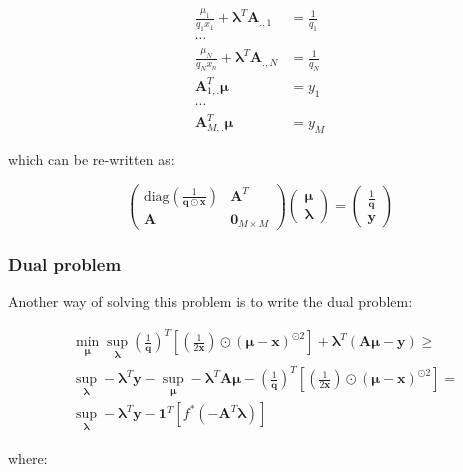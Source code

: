\documentclass{tex/note}
\begin{document}
\begin{align*}
\frac{\mu_1}{q_1 x_1} + \bm{\lambda}^T \bm{A}_{.,1} &= \frac{1}{q_1} \\
\cdots & \\
\frac{\mu_N}{q_N x_n} + \bm{\lambda}^T \bm{A}_{.,N} &= \frac{1}{q_N} \\
\bm{A}_{1,.}^T \bm{\mu} &= y_1 \\
\cdots & \\
\bm{A}_{M,.}^T \bm{\mu} &= y_M
\end{align*}

which can be re-written as:

\begin{equation*}
\begin{pmatrix} \text{diag} \left( \frac{1}{\bm{q} \odot \bm{x}} \right) & \bm{A}^T \\ \bm{A} & \bm{0}_{M \times M} \end{pmatrix} \begin{pmatrix} \bm{\mu} \\ \bm{\lambda} \end{pmatrix} = \begin{pmatrix} \frac{1}{\bm{q}} \\ \bm{y} \end{pmatrix}
\end{equation*}

\subsubsection{Dual problem}

Another way of solving this problem is to write the dual problem:

\begin{align*}
& \min_{\bm{\mu}} \sup_{\bm{\lambda}} \left( \frac{1}{\bm{q}} \right)^T \left[ \left( \frac{1}{2 \bm{x}} \right) \odot \left( \bm{\mu} - \bm{x} \right)^{\odot 2} \right] + \bm{\lambda}^T \left( \bm{A} \bm{\mu} - \bm{y} \right) \geq \\
& \sup_{\bm{\lambda}} - \bm{\lambda}^T \bm{y} - \sup_{\bm{\mu}} - \bm{\lambda}^T \bm{A} \bm{\mu} - \left( \frac{1}{\bm{q}} \right)^T \left[ \left( \frac{1}{2 \bm{x}} \right) \odot \left( \bm{\mu} - \bm{x} \right)^{\odot 2} \right] = \\
& \sup_{\bm{\lambda}} - \bm{\lambda}^T \bm{y} -  \bm{1}^T \left[ f^* \left( - \bm{A}^T \bm{\lambda} \right) \right]
\end{align*}

where:
\end{document}
